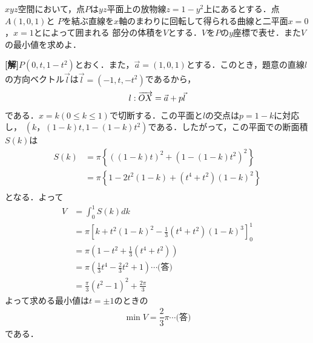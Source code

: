 \documentclass[a4j]{jarticle}
\title{}
\begin{document}

\begin{oframed}
$xyz$空間において，点$P$は$yz$平面上の放物線$z=1-y^2$上にあるとする．点$A(1,0,1)$と
$P$を結ぶ直線を$x$軸のまわりに回転して得られる曲線と二平面$x=0$，$x=1$とによって囲まれる
部分の体積を$V$とする．$V$を$P$の$y$座標で表せ．また$V$の最小値を求めよ．
\end{oframed}

\setlength{\columnseprule}{0.4pt}
\begin{multicols}{2}
{\bf[解]}$P(0,t,1-t^2)$とおく．また，$\vec{a}=(1,0,1)$とする．このとき，題意の直線$l$の方向ベクトル$\vec{l}$は$\vec{l}=(-1,t,-t^2)$であるから，
     \begin{align*}
     l:\overrightarrow{OX}=\vec{a}+p\vec{l}
     \end{align*}
である．$x=k(0\le k\le 1)$で切断する．この平面と$l$の交点は$p=1-k$に対応し，
$\left(k，(1-k)t,1-(1-k)t^2\right)$である．したがって，この平面での断面積$S(k)$は
     \begin{align*}
     S(k)&=\pi\left\{\left((1-k)t\right)^2+\left(1-(1-k)t^2\right)^2\right\} \\
     &=\pi\left\{1-2t^2(1-k)+(t^4+t^2)(1-k)^2\right\} \\
     \end{align*}     
となる．よって
     \begin{align*}
     V&=\int_0^1S(k)dk \\
     &=\pi\left[k+t^2(1-k)^2-\frac{1}{3}(t^4+t^2)(1-k)^3\right]_0^1 \\
     &=\pi(1-t^2+\frac{1}{3}(t^4+t^2)) \\
     &=\pi\left(\frac{1}{3}t^4-\frac{2}{3}t^2+1\right)\cdots\text{(答)} \\
     &=\frac{\pi}{3}\left(t^2-1\right)^2+\frac{2\pi}{3}
     \end{align*}     
よって求める最小値は$t=\pm1$のときの
     \begin{align*}
     \min V=\dfrac{2}{3}\pi\cdots\text{(答)}
     \end{align*}
である．      
          \newpage
\end{multicols}
\end{document}
